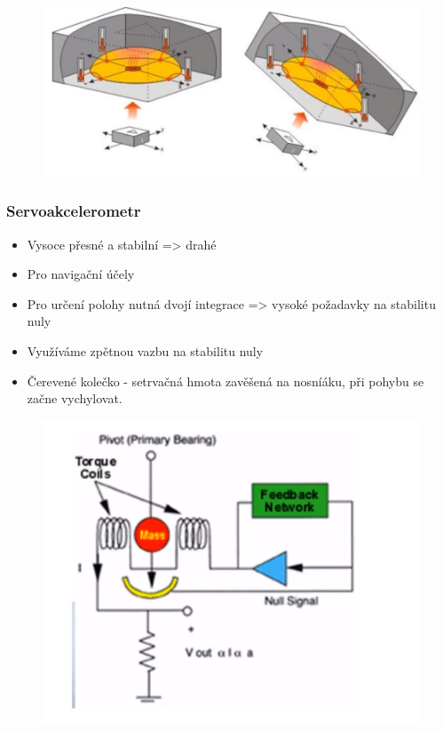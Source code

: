 \begin{figure}[h]
    \centering
    \includegraphics[scale = 0.50]{img/teplovib.png}
\end{figure}

\subsubsection*{Servoakcelerometr}
\begin{itemize}
    \item Vysoce přesné a stabilní => drahé 
    \item Pro navigační účely 
    \item Pro určení polohy nutná dvojí integrace => vysoké požadavky na stabilitu nuly
    \item Využíváme zpětnou vazbu na stabilitu nuly 
    \item Čerevené kolečko - setrvačná hmota zavěšená na nosníáku, při pohybu se začne vychylovat.
\end{itemize}

\begin{figure}[h]
    \centering
    \includegraphics[scale = 0.50]{img/servoakVIB.png}
\end{figure}

